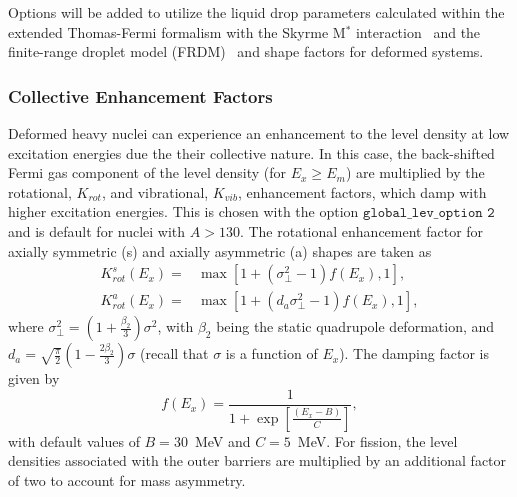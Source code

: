 \documentclass[
10pt,
showpacs,preprintnumbers,footinbib,
amsfonts,amsmath,amssymb,
aps,
prc,twocolumn,groupedaddress,superscriptaddress,
showkeys,
nofootinbib
]{revtex4-1}
\begin{document}
Options will be added to utilize the liquid drop parameters calculated within the extended Thomas-Fermi formalism with the Skyrme M$^*$ interaction~\cite{Guet:1988} and the finite-range droplet model (FRDM)~\cite{Moller:1997} and shape factors for deformed systems.

\subsubsection{Collective Enhancement Factors}

Deformed heavy nuclei can experience an enhancement to the level density at low excitation energies due the their collective nature. In this case, the back-shifted Fermi gas component of the level density (for $E_x \ge E_m$) are multiplied by the rotational, $K_{rot}$, and vibrational, $K_{vib}$, enhancement factors, which damp with higher excitation energies. This is chosen with the option ${\texttt {global\_lev\_option 2}}$ and is default for nuclei with $A > 130$. The rotational enhancement factor for axially symmetric (s) and axially asymmetric (a) shapes are taken as~\cite{TALYS,Junghans:1998,Capote:2009}
\begin{align}
K_{rot}^s(E_x) =& \max [1 + (\sigma^2_\perp-1)f(E_x),1], \\
K_{rot}^a(E_x) =& \max [1 + (d_a\sigma^2_\perp-1)f(E_x),1], 
\end{align}
where $\sigma^2_\perp = (1+ \frac{\beta_2}{3})\sigma^2$, with $\beta_2$ being the static quadrupole deformation, and $d_a = \sqrt{\frac{\pi}{2}}(1-\frac{2\beta_2}{3})\sigma$ (recall that $\sigma$ is a function of $E_x$). The damping factor is given by
\begin{equation}
f(E_x) = \frac{1}{1+\exp\left [\frac{(E_x-B)}{C}\right ]},
\end{equation}
with default values of $B=30$~MeV and $C=5$~MeV.  For fission, the level densities associated with the outer barriers are multiplied by an additional factor of two to account for mass asymmetry. 
\end{document}
